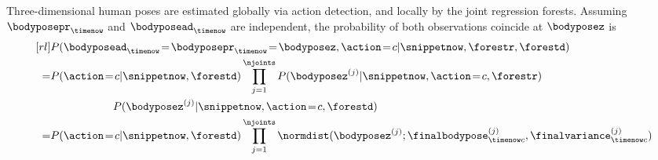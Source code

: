 Three-dimensional human poses are estimated globally via action detection, and locally by the joint regression forests. 
Assuming $\bodyposepr_{\timenow}$ and $\bodyposead_{\timenow}$ are independent, 
the probability of both observations coincide at $\bodyposez$ is 
\begin{equation}
	\label{eq:combination}
	\begin{aligned}[rl] 
		& P( \bodyposead_{\timenow}\!=\!\bodyposepr_{\timenow}\!=\!\bodyposez, \action\!=\!c| \snippetnow, \forestr, \forestd)\\ 
		= & P(\action\!=\!c | \snippetnow, \forestd) \prod_{j = 1}^{\njoints} P( \bodyposez^{(j)} | \snippetnow, \action\!=\!c, \forestr) \\
			 & \hspace{20mm} P( \bodyposez^{(j)}  | \snippetnow, \action\!=\!c, \forestd) \\
		= &  P(\action\!=\!c | \snippetnow, \forestd) \prod_{j = 1}^{\njoints} \normdist(\bodyposez^{(j)}; \finalbodypose^{(j)}_{\timenow c}, \finalvariance^{(j)}_{\timenow c})
	\end{aligned}
\end{equation} 
